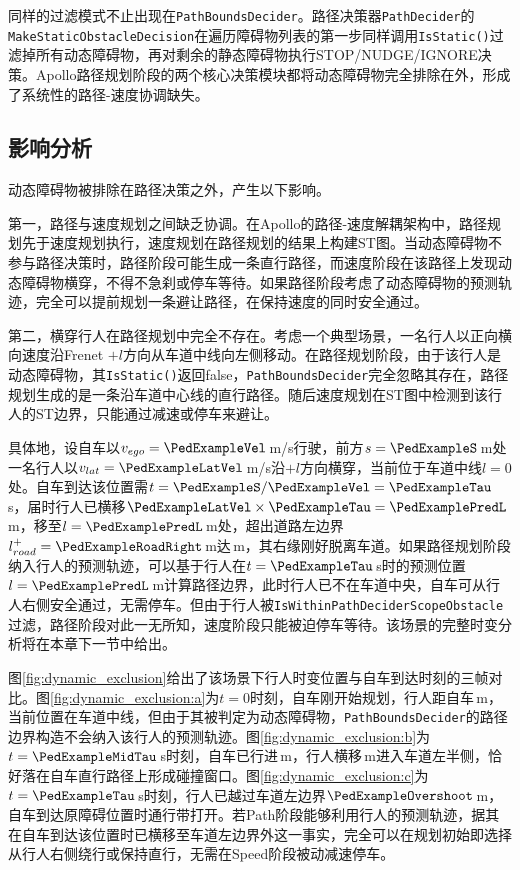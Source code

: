 同样的过滤模式不止出现在\texttt{PathBoundsDecider}。路径决策器\texttt{PathDecider}的\texttt{MakeStaticObstacleDecision}在遍历障碍物列表的第一步同样调用\texttt{IsStatic()}过滤掉所有动态障碍物，再对剩余的静态障碍物执行STOP/NUDGE/IGNORE决策。Apollo路径规划阶段的两个核心决策模块都将动态障碍物完全排除在外，形成了系统性的路径-速度协调缺失。

\subsection{影响分析}

动态障碍物被排除在路径决策之外，产生以下影响。

第一，路径与速度规划之间缺乏协调。在Apollo的路径-速度解耦架构中，路径规划先于速度规划执行，速度规划在路径规划的结果上构建ST图。当动态障碍物不参与路径决策时，路径阶段可能生成一条直行路径，而速度阶段在该路径上发现动态障碍物横穿，不得不急刹或停车等待。如果路径阶段考虑了动态障碍物的预测轨迹，完全可以提前规划一条避让路径，在保持速度的同时安全通过。

第二，横穿行人在路径规划中完全不存在。考虑一个典型场景，一名行人以正向横向速度沿Frenet $+l$方向从车道中线向左侧移动。在路径规划阶段，由于该行人是动态障碍物，其\texttt{IsStatic()}返回false，\texttt{PathBoundsDecider}完全忽略其存在，路径规划生成的是一条沿车道中心线的直行路径。随后速度规划在ST图中检测到该行人的ST边界，只能通过减速或停车来避让。

具体地，设自车以$v_{ego} = \PedExampleVel$\,m/s行驶，前方$s = \PedExampleS$\,m处一名行人以$v_{lat} = \PedExampleLatVel$\,m/s沿$+l$方向横穿，当前位于车道中线$l = 0$处。自车到达该位置需$t = \PedExampleS/\PedExampleVel = \PedExampleTau$\,s，届时行人已横移$\PedExampleLatVel \times \PedExampleTau = \PedExamplePredL$\,m，移至$l = \PedExamplePredL$\,m处，超出道路左边界$l_{road}^+=\PedExampleRoadRight$\,m达\PedExampleOvershoot\,m，其右缘刚好脱离车道。如果路径规划阶段纳入行人的预测轨迹，可以基于行人在$t = \PedExampleTau$\,s时的预测位置$l = \PedExamplePredL$\,m计算路径边界，此时行人已不在车道中央，自车可从行人右侧安全通过，无需停车。但由于行人被\texttt{IsWithinPathDeciderScopeObstacle}过滤，路径阶段对此一无所知，速度阶段只能被迫停车等待。该场景的完整时变分析将在本章下一节中给出。

图\ref{fig:dynamic_exclusion}给出了该场景下行人时变位置与自车到达时刻的三帧对比。图\ref{fig:dynamic_exclusion:a}为$t=0$时刻，自车刚开始规划，行人距自车\PedExampleS\,m，当前位置在车道中线，但由于其被判定为动态障碍物，\texttt{PathBoundsDecider}的路径边界构造不会纳入该行人的预测轨迹。图\ref{fig:dynamic_exclusion:b}为$t=\PedExampleMidTau$\,s时刻，自车已行进\PedExampleMidS\,m，行人横移\PedExampleMidLatShift\,m进入车道左半侧，恰好落在自车直行路径上形成碰撞窗口。图\ref{fig:dynamic_exclusion:c}为$t=\PedExampleTau$\,s时刻，行人已越过车道左边界$\PedExampleOvershoot$\,m，自车到达原障碍位置时通行带打开。若Path阶段能够利用行人的预测轨迹，据其在自车到达该位置时已横移至车道左边界外这一事实，完全可以在规划初始即选择从行人右侧绕行或保持直行，无需在Speed阶段被动减速停车。

